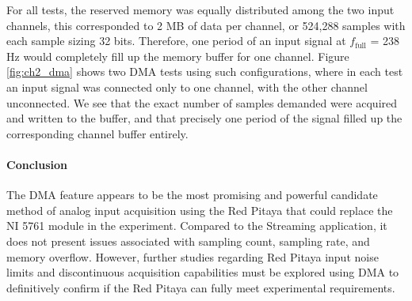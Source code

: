 For all tests, the reserved memory was equally distributed among the two input channels, this corresponded to 2 MB of data per channel, or 524,288 samples with each sample sizing 32 bits. Therefore, one period of an input signal at $f_\text{full}$ = 238 Hz would completely fill up the memory buffer for one channel. Figure \ref{fig:ch2_dma} shows two DMA tests using such configurations, where in each test an input signal was connected only to one channel, with the other channel unconnected. We see that the exact number of samples demanded were acquired and written to the buffer, and that precisely one period of the signal filled up the corresponding channel buffer entirely.


\paragraph{Conclusion}

The DMA feature appears to be the most promising and powerful candidate method of analog input acquisition using the Red Pitaya that could replace the NI 5761 module in the experiment. Compared to the Streaming application, it does not present issues associated with sampling count, sampling rate, and memory overflow. However, further studies regarding Red Pitaya input noise limits and discontinuous acquisition capabilities must be explored using DMA to definitively confirm if the Red Pitaya can fully meet experimental requirements.
